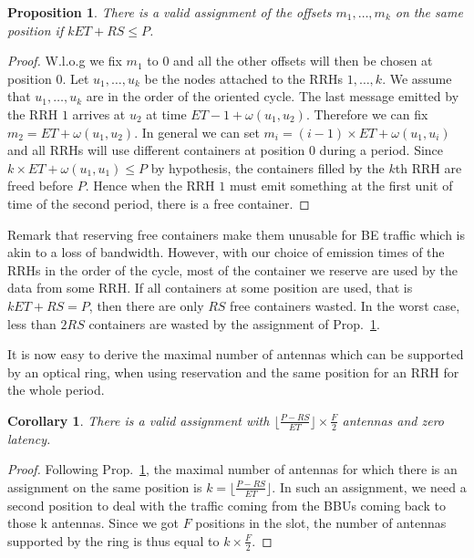 \documentclass[10pt, conference, letterpaper]{IEEEtran}
\newtheorem{prop}{Proposition}
\newtheorem{corollary}{Corollary}
\begin{document}
\begin{prop}
\label{prop:assign}
There is a valid assignment of the offsets $m_1, \dots, m_k$ on the same position if  $k ET + RS \leq P$.
\end{prop}
\begin{proof}
 W.l.o.g we fix $m_1$ to $0$ and all the other offsets will then be chosen at position $0$.  Let $u_1,\dots,u_k$ be the nodes attached to the RRHs $1,\dots,k$. We assume that $u_1,\dots,u_k$ are in the order of the oriented cycle. The last message emitted by the RRH $1$ arrives at $u_2$ at time $ET - 1 + \omega(u_1,u_2)$. Therefore we can fix $m_2 =  ET  + \omega(u_1,u_2)$. In general we can set $m_i = (i-1) \times ET + \omega(u_1,u_i)$ and all RRHs will use different containers at position $0$ during a period. Since $k \times ET + \omega(u_1,u_1) \leq P$ by hypothesis,
 the containers filled by the $k$th RRH are freed before $P$. Hence when the RRH $1$ must emit something at the first unit of time of the second period, there is a free container.
\end{proof}

Remark that reserving free containers make them unusable for BE traffic which is akin to a loss of bandwidth. However, with our choice of emission times of the RRHs in the order of the cycle, most of the container we reserve are used by the data from some RRH. If all containers at some position are used, that is $kET +RS = P$, then there are only $RS$ free containers wasted. In the worst case, less than $2RS$ containers are wasted by the assignment of Prop.~\ref{prop:assign}. 

It is now easy to derive the maximal number of antennas which can be supported by an optical ring, when using reservation and the same position for an RRH for the whole period.

\begin{corollary}
There is a valid assignment with $ \lfloor\frac{P- RS}{ET}\rfloor \times \frac{F}{2}$ antennas and zero latency.
\end{corollary}
\begin{proof}
Following Prop.~\ref{prop:assign}, the maximal number of antennas for which there is an assignment on the same position is $k = \lfloor\frac{P- RS}{ET}\rfloor $.
In such an assignment, we need a second position to deal with the traffic coming from the BBUs coming back to those k antennas. Since we got  $F$ positions in the slot, the number of antennas supported by the ring is thus equal to $k \times \frac{F}{2}$.
\end{proof}
\end{document}
